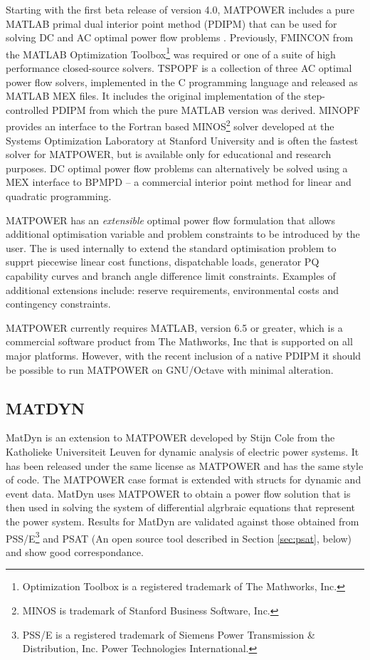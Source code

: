 Starting with the first beta release of version 4.0, MATPOWER includes a pure
MATLAB primal dual interior point method (PDIPM) that can be used for solving
DC and AC optimal power flow problems \cite{zimmerman:ccv}.  Previously,
FMINCON from the MATLAB Optimization Toolbox\footnote{Optimization Toolbox is a registered trademark
of The Mathworks, Inc.} was required or one of a suite of high performance
closed-source solvers.  TSPOPF is a collection of three AC optimal power flow
solvers, implemented in the C programming language and released as MATLAB MEX
files.  It includes the original implementation of the step-controlled PDIPM
from which the pure MATLAB version was derived.  MINOPF provides an interface
to the Fortran based MINOS\footnote{MINOS is trademark of Stanford Business
Software, Inc.} solver developed at the Systems Optimization Laboratory at
Stanford University and is often the fastest solver for MATPOWER, but is
available only for educational and research purposes.  DC optimal power flow
problems can alternatively be solved using a MEX interface to BPMPD -- a
commercial interior point method for linear and quadratic programming.

MATPOWER has an \textit{extensible} optimal power flow formulation that allows
additional optimisation variable and problem constraints to be introduced by
the user.  The is used internally to extend the standard optimisation problem
to supprt piecewise linear cost functions, dispatchable loads, generator PQ
capability curves and branch angle difference limit constraints.  Examples of
additional extensions include: reserve requirements, environmental costs and
contingency constraints.

MATPOWER currently requires MATLAB, version 6.5 or greater, which is a
commercial software product from The Mathworks, Inc that is supported on all
major platforms.  However, with the recent inclusion of a native PDIPM it
should be possible to run MATPOWER on GNU/Octave with minimal alteration.

\subsection{MATDYN}
MatDyn is an extension to MATPOWER developed by Stijn Cole from the Katholieke
Universiteit Leuven for dynamic analysis of electric power systems.  It has
been released under the same license as MATPOWER and has the same style of
code.  The MATPOWER case format is extended with structs for dynamic and event
data.  MatDyn uses MATPOWER to obtain a power flow solution that is then used
in solving the system of differential algrbraic equations that represent the
power system.  Results for MatDyn are validated against those obtained from
PSS/E\footnote{PSS/E is a registered trademark of Siemens Power Transmission \&
Distribution, Inc. Power Technologies International.} and PSAT (An open source
tool described in Section \ref{sec:psat}, below) and show good correspondance.

